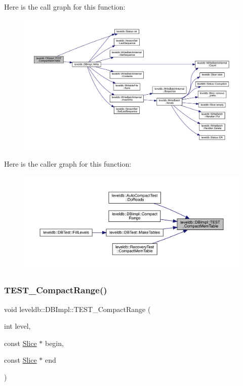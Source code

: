 Here is the call graph for this function\+:
\nopagebreak
\begin{figure}[H]
\begin{center}
\leavevmode
\includegraphics[width=350pt]{classleveldb_1_1_d_b_impl_a8642703fd1398cd8e3f5f24ee0b9da23_cgraph}
\end{center}
\end{figure}
Here is the caller graph for this function\+:
\nopagebreak
\begin{figure}[H]
\begin{center}
\leavevmode
\includegraphics[width=350pt]{classleveldb_1_1_d_b_impl_a8642703fd1398cd8e3f5f24ee0b9da23_icgraph}
\end{center}
\end{figure}
\mbox{\label{classleveldb_1_1_d_b_impl_a63fcb49466b689a534ba77d32cf84f99}} 
\subsubsection{\texorpdfstring{TEST\_CompactRange()}{TEST\_CompactRange()}}
{\footnotesize\ttfamily void leveldb\+::\+D\+B\+Impl\+::\+T\+E\+S\+T\+\_\+\+Compact\+Range (\begin{DoxyParamCaption}\item[{int}]{level,  }\item[{const \mbox{\hyperlink{classleveldb_1_1_slice}{Slice}} $\ast$}]{begin,  }\item[{const \mbox{\hyperlink{classleveldb_1_1_slice}{Slice}} $\ast$}]{end }\end{DoxyParamCaption})}

